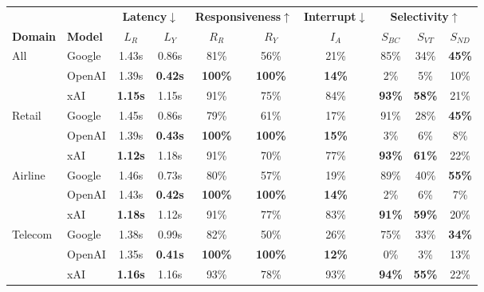\begin{tabular}{@{}ll|cc|cc|c|ccc@{}}
\toprule
 & & \multicolumn{2}{c|}{\textbf{Latency}$\downarrow$} & \multicolumn{2}{c|}{\textbf{Responsiveness}$\uparrow$} & \textbf{Interrupt}$\downarrow$ & \multicolumn{3}{c}{\textbf{Selectivity}$\uparrow$} \\
\textbf{Domain} & \textbf{Model} & $L_R$ & $L_Y$ & $R_R$ & $R_Y$ & $I_A$ & $S_{BC}$ & $S_{VT}$ & $S_{ND}$ \\
\midrule
\multirow{3}{*}{All} & Google & 1.43s & 0.86s & 81\% & 56\% & 21\% & 85\% & 34\% & \textbf{45\%} \\
 & OpenAI & 1.39s & \textbf{0.42s} & \textbf{100\%} & \textbf{100\%} & \textbf{14\%} & 2\% & 5\% & 10\% \\
 & xAI & \textbf{1.15s} & 1.15s & 91\% & 75\% & 84\% & \textbf{93\%} & \textbf{58\%} & 21\% \\
\midrule
\multirow{3}{*}{Retail} & Google & 1.45s & 0.86s & 79\% & 61\% & 17\% & 91\% & 28\% & \textbf{45\%} \\
 & OpenAI & 1.39s & \textbf{0.43s} & \textbf{100\%} & \textbf{100\%} & \textbf{15\%} & 3\% & 6\% & 8\% \\
 & xAI & \textbf{1.12s} & 1.18s & 91\% & 70\% & 77\% & \textbf{93\%} & \textbf{61\%} & 22\% \\
\midrule
\multirow{3}{*}{Airline} & Google & 1.46s & 0.73s & 80\% & 57\% & 19\% & 89\% & 40\% & \textbf{55\%} \\
 & OpenAI & 1.43s & \textbf{0.42s} & \textbf{100\%} & \textbf{100\%} & \textbf{14\%} & 2\% & 6\% & 7\% \\
 & xAI & \textbf{1.18s} & 1.12s & 91\% & 77\% & 83\% & \textbf{91\%} & \textbf{59\%} & 20\% \\
\midrule
\multirow{3}{*}{Telecom} & Google & 1.38s & 0.99s & 82\% & 50\% & 26\% & 75\% & 33\% & \textbf{34\%} \\
 & OpenAI & 1.35s & \textbf{0.41s} & \textbf{100\%} & \textbf{100\%} & \textbf{12\%} & 0\% & 3\% & 13\% \\
 & xAI & \textbf{1.16s} & 1.16s & 93\% & 78\% & 93\% & \textbf{94\%} & \textbf{55\%} & 22\% \\
\bottomrule
\end{tabular}